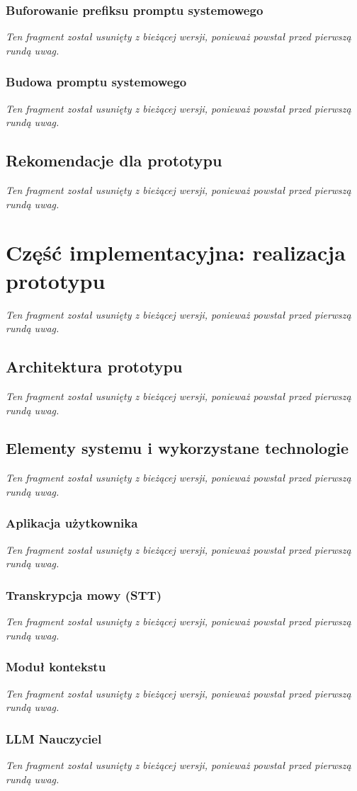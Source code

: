 \documentclass[
    a4paper,
    left=25mm,
    right=25mm,
    top=25mm,
    bottom=25mm,
    bindingoffset=5mm,
    nohyphenation=false
]{src/wut-thesis}
\newcommand{\nieredagowane}{%
\textit{Ten fragment został usunięty z bieżącej wersji, ponieważ powstał przed pierwszą rundą uwag.}%
}
\begin{document}
\subsubsection{Buforowanie prefiksu promptu systemowego}
\nieredagowane

\subsubsection{Budowa promptu systemowego}
\nieredagowane

\subsection{Rekomendacje dla prototypu}
\nieredagowane

\newpage
\section{Część implementacyjna: realizacja prototypu}
\label{sec:realizacja}
\nieredagowane

\subsection{Architektura prototypu}
\nieredagowane

\subsection{Elementy systemu i wykorzystane technologie}
\nieredagowane

\subsubsection{Aplikacja użytkownika}
\nieredagowane

\subsubsection{Transkrypcja mowy (STT)}
\nieredagowane

\subsubsection{Moduł kontekstu}
\nieredagowane

\subsubsection{LLM Nauczyciel}
\nieredagowane
\end{document}
